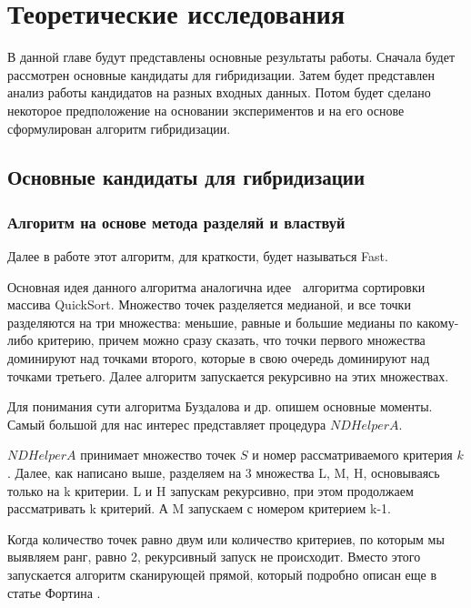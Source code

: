 \chapter{Теоретические исследования}
\label{chapter2}

В данной главе будут представлены основные результаты работы. Сначала будет рассмотрен основные кандидаты для гибридизации. Затем будет представлен анализ работы кандидатов на разных входных данных. Потом будет сделано некоторое предположение на основании экспериментов и на его основе сформулирован алгоритм гибридизации. 

\section{Основные кандидаты для гибридизации}

\subsection{Алгоритм на основе метода разделяй и властвуй}

Далее в работе этот алгоритм, для краткости, будет называться Fast.

Основная идея данного алгоритма аналогична идее алгоритма сортировки массива QuickSort. Множество точек разделяется медианой, и все точки разделяются на три множества: меньшие, равные и большие медианы по какому-либо критерию, причем можно сразу сказать, что точки первого множества доминируют над точками второго, которые в свою очередь доминируют над точками третьего. Далее алгоритм запускается рекурсивно на этих множествах.

Для понимания сути алгоритма Буздалова и др. \cite{Buzdalov} опишем основные моменты. Самый большой для нас интерес представляет процедура $NDHelperA$.

$NDHelperA$ принимает множество точек $S$ и номер рассматриваемого критерия $k$.  Далее, как написано выше, разделяем на 3 множества L, M, H, основываясь только на k критерии. L и H запускам рекурсивно, при этом продолжаем рассматривать k критерий. А M запускаем с номером критерием k-1.

Когда количество точек равно двум или количество критериев, по которым мы выявляем ранг, равно 2, рекурсивный запуск не происходит. Вместо этого запускается алгоритм сканирующей прямой, который подробно описан еще в статье Фортина \cite{Forton}. 

